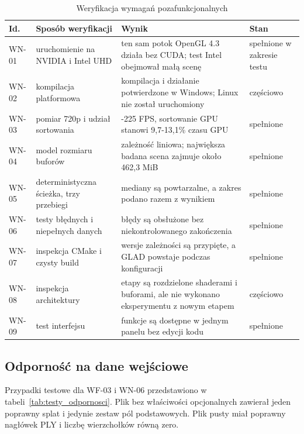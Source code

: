 \begin{table}[htbp]
  \centering
  \caption{Weryfikacja wymagań pozafunkcjonalnych}
  \label{tab:weryfikacja_wn}
  \scriptsize
  \renewcommand{\arraystretch}{1.12}
  \begin{tabularx}{\textwidth}{
      >{\raggedright\arraybackslash}p{}
      >{\raggedright\arraybackslash}p{}
      >{\raggedright\arraybackslash}X
      >{\raggedright\arraybackslash}p{}}
    \toprule
    \textbf{Id.} & \textbf{Sposób weryfikacji} & \textbf{Wynik} & \textbf{Stan} \\
    \midrule
    WN-01 & uruchomienie na NVIDIA i Intel UHD & ten sam potok OpenGL 4.3 działa bez CUDA; test Intel obejmował małą scenę & spełnione w zakresie testu \\
    WN-02 & kompilacja platformowa & kompilacja i działanie potwierdzone w Windows; Linux nie został uruchomiony & częściowo \\
    WN-03 & pomiar 720p i udział sortowania & 127-225 FPS, sortowanie GPU stanowi 9,7-13,1\% czasu GPU & spełnione \\
    WN-04 & model rozmiaru buforów & zależność liniowa; największa badana scena zajmuje około 462,3 MiB & spełnione \\
    WN-05 & deterministyczna ścieżka, trzy przebiegi & mediany są powtarzalne, a zakres podano razem z wynikiem & spełnione \\
    WN-06 & testy błędnych i niepełnych danych & błędy są obsłużone bez niekontrolowanego zakończenia & spełnione \\
    WN-07 & inspekcja CMake i czysty build & wersje zależności są przypięte, a GLAD powstaje podczas konfiguracji & spełnione \\
    WN-08 & inspekcja architektury & etapy są rozdzielone shaderami i buforami, ale nie wykonano eksperymentu z nowym etapem & częściowo \\
    WN-09 & test interfejsu & funkcje są dostępne w jednym panelu bez edycji kodu & spełnione \\
    \bottomrule
  \end{tabularx}
\end{table}

\subsection{Odporność na dane wejściowe}

Przypadki testowe dla WF-03 i WN-06 przedstawiono w tabeli~\ref{tab:testy_odpornosci}. Plik bez właściwości opcjonalnych zawierał jeden poprawny splat i jedynie zestaw pól podstawowych. Plik pusty miał poprawny nagłówek PLY i liczbę wierzchołków równą zero.

